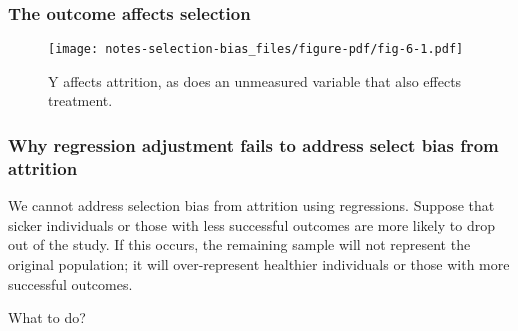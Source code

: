 \documentclass[
  singlecolumn,
  9pt]{article}
\begin{document}
\subsubsection{The outcome affects
selection}\label{the-outcome-affects-selection}

\begin{figure}

{\centering \texttt{[image: notes-selection-bias\_files/figure-pdf/fig-6-1.pdf]}

}

\caption{\label{fig-6}Y affects attrition, as does an unmeasured
variable that also effects treatment.}

\end{figure}

\subsubsection{Why regression adjustment fails to address select bias
from
attrition}\label{why-regression-adjustment-fails-to-address-select-bias-from-attrition}

We cannot address selection bias from attrition using regressions.
Suppose that sicker individuals or those with less successful outcomes
are more likely to drop out of the study. If this occurs, the remaining
sample will not represent the original population; it will
over-represent healthier individuals or those with more successful
outcomes.

What to do?
\end{document}
